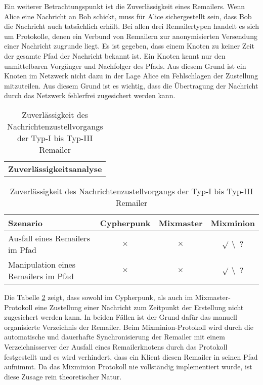 Ein weiterer Betrachtungspunkt ist die Zuverlässigkeit eines Remailers. Wenn Alice eine Nachricht an Bob schickt, muss für Alice sichergestellt sein, dass Bob die Nachricht auch tatsächlich erhält. Bei allen drei Remailertypen handelt es sich um Protokolle, denen ein Verbund von Remailern zur anonymisierten Versendung einer Nachricht zugrunde liegt. Es ist gegeben, dass einem Knoten zu keiner Zeit der gesamte Pfad der Nachricht bekannt ist. Ein Knoten kennt nur den unmittelbaren Vorgänger und Nachfolger des Pfads. Aus diesem Grund ist ein Knoten im Netzwerk nicht dazu in der Lage Alice ein Fehlschlagen der Zustellung mitzuteilen. Aus diesem Grund ist es wichtig, dass die Übertragung der Nachricht durch das Netzwerk fehlerfrei zugesichert werden kann.

\begin{table}[htbp]
	\centering
	\begin{tabular}{c}
		\textbf{Zuverlässigkeitsanalyse}
	\end{tabular}
		
	\begin{tabular}{m{7.5cm} || c | c | c}
		\hline
		\textbf{Szenario} & \textbf{Cypherpunk} & \textbf{Mixmaster} & \textbf{Mixminion} \\
		\hline
		Ausfall eines Remailers im Pfad & $\times$ & $\times$ & $\surd$ \textbackslash ~? \\
		Manipulation eines Remailers im Pfad & $\times$ & $\times$ & $\surd$ \textbackslash ~? \\
	\end{tabular}

	\caption{Zuverlässigkeit des Nachrichtenzustellvorgangs der Typ-I bis Typ-III Remailer}
	\label{zuverlässigkeit}
\end{table}

Die Tabelle \ref{zuverlässigkeit} zeigt, dass sowohl im Cypherpunk, als auch im Mixmaster- Protokoll eine Zustellung einer Nachricht zum Zeitpunkt der Erstellung nicht zugesichert werden kann. In beiden Fällen ist der Grund dafür das manuell organisierte Verzeichnis der Remailer. Beim Mixminion-Protokoll wird durch die automatische und dauerhafte Synchronisierung der Remailer mit einem Verzeichnisserver der Ausfall eines Remailerknotens durch das Protokoll festgestellt und es wird verhindert, dass ein Klient diesen Remailer in seinen Pfad aufnimmt. Da das Mixminion Protokoll nie vollständig implementiert wurde, ist diese Zusage rein theoretischer Natur.
